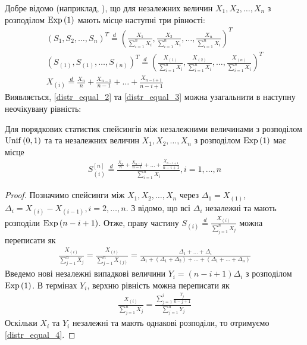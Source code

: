 Добре відомо (наприклад, \cite{Holst_1980}), що для незалежних величин 
$X_1, X_2, \dots, X_{n}$ з розподілом $\mathrm{Exp}\left(1\right)$
мають місце наступні три рівності:
\begin{gather}
    \label{distr_equal_1}
    \left(
        S_1, S_2, \dots, S_{n}
    \right)^T
    \overset{d}{=}
    \left(
        \frac{X_1}{\sum_{i=1}^{n}X_i},
        \frac{X_2}{\sum_{i=1}^{n}X_i},
        \dots,
        \frac{X_{n}}{\sum_{i=1}^{n}X_i}
    \right)^T \\
    \label{distr_equal_2}
    \left(
        S_{(1)}, S_{(1)}, \dots, S_{(n)}
    \right)^T
    \overset{d}{=}
    \left(
        \frac{X_{(1)}}{\sum_{i=1}^{n}X_i},
        \frac{X_{(2)}}{\sum_{i=1}^{n}X_i},
        \dots,
        \frac{X_{(n)}}{\sum_{i=1}^{n}X_i}
    \right)^T \\
    \label{distr_equal_3}
    X_{(i)} \overset{d}{=}
    \frac{X_n}{n} + \frac{X_{n-1}}{n-1} + \dots + \frac{X_{n-i+1}}{n-i+1}
\end{gather}
Виявляється, \eqref{distr_equal_2} та \eqref{distr_equal_3}
можна узагальнити в наступну неочікувану рівність:
\begin{lemma}\label{distr_equal}
    Для порядкових статистик спейсингів між незалежними величинами з розподілом $\mathrm{Unif}\left(0, 1\right)$ та
    та незалежних величин 
    $X_1, X_2, \dots, X_{n}$ з розподілом $\mathrm{Exp}\left(1\right)$ має місце
    \begin{gather}\label{distr_equal_4}
        S_{(i)}^{[n]} \overset{d}{=}
        \frac{
            \frac{X_n}{n} + \frac{X_{n-1}}{n-1} + \dots + \frac{X_{n-i+1}}{n-i+1}
        }{
            \sum_{i=1}^{n}X_i
        }, i = 1, \dots, n
    \end{gather}
\end{lemma}
\begin{proof}
    Позначимо спейсинги між $X_1, X_2, \dots, X_n$ через
    $\Delta_1 = X_{(1)}$,
    $\Delta_i = X_{(i)} - X_{(i-1)}, i=2, \dots, n$. З \cite{Arnold_et_al_2008} відомо, що
    всі $\Delta_i$ незалежні та мають розподіли $\mathrm{Exp}\left(n-i+1\right)$.
    Отже, праву частину $S_{(i)} \overset{d}{=} \frac{X_{(i)}}{\sum_{j=1}^{n}X_j}$
    можна переписати як
    \begin{gather*}
        \frac{X_{(i)}}{\sum_{j=1}^{n}X_j} = 
        \frac{X_{(i)}}{\sum_{j=1}^{n}X_{(j)}} = 
        \frac{
            \Delta_1 + \dots + \Delta_i
        }{
            \Delta_1 + \left(\Delta_1 + \Delta_2\right) +
            \dots + \left(\Delta_1 + \dots + \Delta_n\right)
        }
    \end{gather*}
    Введемо нові незалежні випадкові величини
    $Y_i = (n-i+1)\Delta_i$ з розподілом
    $\mathrm{Exp}\left(1\right)$. В термінах $Y_i$,
    верхню рівність можна переписати як
    \begin{gather*}
        \frac{X_{(i)}}{\sum_{j=1}^{n}X_j} = 
        \frac{
            \sum_{j=1}^i \frac{Y_j}{n-j+1} 
        }{
            \sum_{j=1}^n Y_j
        }
    \end{gather*}
    Оскільки $X_i$ та $Y_i$ незалежні та мають однакові розподіли, то отримуємо \eqref{distr_equal_4}.
\end{proof}

